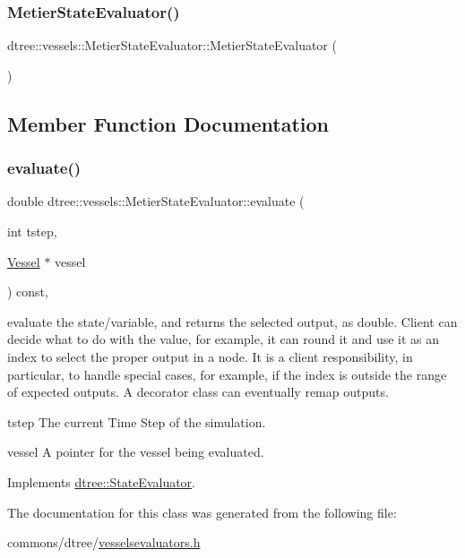 \subsubsection{\texorpdfstring{MetierStateEvaluator()}{MetierStateEvaluator()}}
{\footnotesize\ttfamily dtree\+::vessels\+::\+Metier\+State\+Evaluator\+::\+Metier\+State\+Evaluator (\begin{DoxyParamCaption}{ }\end{DoxyParamCaption})\hspace{0.3cm}{\ttfamily [inline]}}



\subsection{Member Function Documentation}
\mbox{\label{classdtree_1_1vessels_1_1_metier_state_evaluator_acce952a17d43e9bd1a16a2ae2ec7161e}} 
\subsubsection{\texorpdfstring{evaluate()}{evaluate()}}
{\footnotesize\ttfamily double dtree\+::vessels\+::\+Metier\+State\+Evaluator\+::evaluate (\begin{DoxyParamCaption}\item[{int}]{tstep,  }\item[{\mbox{\hyperlink{class_vessel}{Vessel}} $\ast$}]{vessel }\end{DoxyParamCaption}) const\hspace{0.3cm}{\ttfamily [inline]}, {\ttfamily [virtual]}}



evaluate the state/variable, and returns the selected output, as double. Client can decide what to do with the value, for example, it can round it and use it as an index to select the proper output in a node. It is a client responsibility, in particular, to handle special cases, for example, if the index is outside the range of expected outputs. A decorator class can eventually remap outputs. 

\begin{DoxyItemize}
\item tstep The current Time Step of the simulation. \item vessel A pointer for the vessel being evaluated. \end{DoxyItemize}


Implements \mbox{\hyperlink{classdtree_1_1_state_evaluator_ab57666219fbdc728f40d9d5acd5726cb}{dtree\+::\+State\+Evaluator}}.



The documentation for this class was generated from the following file\+:\begin{DoxyCompactItemize}
\item 
commons/dtree/\mbox{\hyperlink{vesselsevaluators_8h}{vesselsevaluators.\+h}}\end{DoxyCompactItemize}
